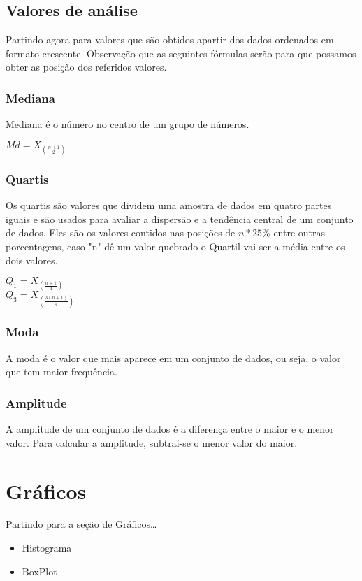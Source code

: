 \documentclass{article}
\begin{document}
\begin{multicols}{2}
  \subsection{Valores de análise}
    Partindo agora para valores que são obtidos apartir dos dados ordenados em formato crescente. Observação que as seguintes fórmulas serão para que possamos obter as posição dos referidos valores.    
    
    \subsubsection{Mediana}
    Mediana é o número no centro de um grupo de números.
    \begin{center}
      $ Md = X_{(\frac{n + 1}{2})} $
    \end{center}

    \subsubsection{Quartis}
    Os quartis são valores que dividem uma amostra de dados em quatro partes iguais e são usados para avaliar a dispersão e a tendência central de um conjunto de dados. Eles são os valores contidos nas posições de $ n*25\% $ entre outras porcentagens, caso "n" dê um valor quebrado o Quartil vai ser a média entre os dois valores.
    \begin{center}
      $ Q_1 = X_{(\frac{n + 1}{4})} $ \\
      $ Q_3 = X_{(\frac{3(n + 1)}{4})} $
    \end{center}

    \subsubsection{Moda}
    A moda é o valor que mais aparece em um conjunto de dados, ou seja, o valor que tem maior frequência.
    
    \subsubsection{Amplitude}
    A amplitude de um conjunto de dados é a diferença entre o maior e o menor valor. Para calcular a amplitude, subtrai-se o menor valor do maior. 

\section{Gráficos}
  Partindo para a seção de Gráficos\dots
  
  \begin{itemize}
    \item Histograma
    \item BoxPlot
  \end{itemize}

\end{multicols} %
\end{document}
